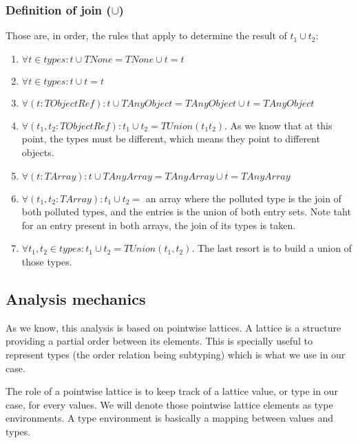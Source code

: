 \documentclass[a4paper]{article}
\begin{document}
\subsubsection{Definition of join ($\cup$)}
Those are, in order, the rules that apply to determine the result of $t_1 \cup t_2$:
\begin{enumerate}
  \item $\forall t \in types : t \cup TNone = TNone \cup t = t$
  \item $\forall t \in types : t \cup t = t$
  \item $\forall (t: TObjectRef): t \cup TAnyObject = TAnyObject \cup t = TAnyObject$
  \item $\forall (t_1,t_2: TObjectRef): t_1 \cup t_2 = TUnion(t_1 t_2)$. As we
    know that at this point, the types must be different, which means they
    point to different objects.
  \item $\forall (t: TArray): t \cup TAnyArray = TAnyArray \cup t = TAnyArray$
  \item $\forall (t_1,t_2: TArray): t_1 \cup t_2 = $ an array where the
    polluted type is the join of both polluted types, and the entries is the
    union of both entry sets. Note taht for an entry present in both arrays,
    the join of its types is taken.

  \item $\forall t_1,t_2 \in types: t_1 \cup t_2 = TUnion(t_1, t_2)$. The last
    resort is to build a union of those types.
\end{enumerate}

\subsection{Analysis mechanics}
As we know, this analysis is based on pointwise lattices. A lattice is a
structure providing a partial order between its elements. This is specially
useful to represent types (the order relation being subtyping) which is what
we use in our case.

The role of a pointwise lattice is to keep track of a lattice value, or type in
our case, for every values. We will denote those pointwise lattice elements as
type environments. A type environment is basically a mapping between values and
types.
\end{document}

